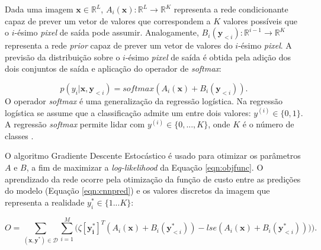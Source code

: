 Dada uma imagem $ \boldsymbol{x} \in \mathbb{R}^L $, $A_i(\boldsymbol{x}) : \mathbb{R}^L \rightarrow \mathbb{R}^K$
representa a rede condicionante capaz de prever um vetor de valores que correspondem a $K$ valores
possíveis que o $i$-ésimo \textit{pixel} de saída pode assumir. Analogamente,
$B_i(\boldsymbol{y}_{<i}) : \mathbb{R}^{i-1} \rightarrow \mathbb{R}^K$ representa a rede \textit{prior}
capaz de prever um vetor de valores do $i$-ésimo \textit{pixel}. A previsão da distribuição
sobre o $i$-ésimo \textit{pixel} de saída é obtida pela adição dos dois conjuntos de saída e aplicação
do operador de \textit{softmax}:

\begin{equation}
\label{eqn:cnnpred}
p(y_i|\boldsymbol{x},\boldsymbol{y}_{<i}) = softmax(A_i(\boldsymbol{x}) + B_i(\boldsymbol{y}_{<i})).
\end{equation}
O operador \textit{softmax} é uma generalização da regressão logística. Na regressão logística se assume que a classificação 
admite um entre dois valores: $y^{(i)} \in \{ 0,1\}$. A regressão \textit{softmax} permite lidar com
$y^{(i)} \in \{ 0,...,K\}$, onde $K$  é o número de classes \citep{Nielson15}.

O algoritmo Gradiente Descente Estocástico é usado para otimizar os parâmetros $A$ e $B$, a fim de maximizar
a \textit{log-likelihood} da Equação \ref{eqn:objfunc}. O aprendizado da rede ocorre pela otimização da função de custo entre
as predições do modelo (Equação \ref{eqn:cnnpred}) e os valores discretos da imagem que representa
a realidade $y_i^* \in \{1...K\}$:

\begin{equation}
\label{eqn:cnncostfunc}
O = \sum_{(\boldsymbol{x},\boldsymbol{y^*})\in \mathcal{D}} \sum_{i=1}^{M}\big(\zeta [\boldsymbol{y_i^*}]^T(A_i(\boldsymbol{x}) + B_i(\boldsymbol{y}_{<i}^*))
-lse(A_i(\boldsymbol{x}) + B_i(\boldsymbol{y}_{<i}^*))) \big).
\end{equation}

